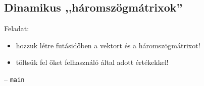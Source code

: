 \documentclass[usenames,dvipsnames,aspectratio=169]{beamer}
\begin{document}
\subsection{Dinamikus ,,háromszögmátrixok''}
\begin{frame}
  Feladat: 
  \begin{itemize}
    \item hozzuk létre futásidőben a vektort és a háromszögmátrixot!
    \item töltsük fel őket felhasználó által adott értékekkel!
  \end{itemize}
  \begin{exampleblock}{}
    \scriptsize
    \vspace{-.2cm}
    
    \vspace{-.2cm}
  \end{exampleblock}
\end{frame}

\begin{frame}
  \begin{exampleblock}{ -- \texttt{main}}
    \footnotesize
    
  \end{exampleblock}
\end{frame}

\begin{frame}
  \begin{exampleblock}{}
    
  \end{exampleblock}
\end{frame}

\begin{frame}
  \begin{exampleblock}{}
    \vspace{-.2cm}
    
    \vspace{-.2cm}
  \end{exampleblock}
\end{frame}

\begin{frame}
  \begin{exampleblock}{}
    \vspace{-.2cm}
    
    \vspace{-.2cm}
  \end{exampleblock}
\end{frame}
\end{document}
